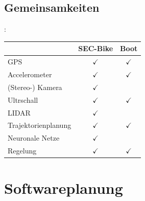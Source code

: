 \documentclass{beamer}
\begin{document}
\subsection{Gemeinsamkeiten}
\begin{frame}{\insertsection: \insertsubsection}
\begin{table}
	\begin{tabular}{|l|c|c|}
		\hline
		& SEC-Bike & Boot \\ \hline
		GPS & $\checkmark$ & $\checkmark$ \\ \hline
		Accelerometer & $\checkmark$ & $\checkmark$ \\ \hline
		(Stereo-) Kamera & $\checkmark$ & \\ \hline
		Ultrschall & $\checkmark$ & $\checkmark$ \\ \hline
		LIDAR & $\checkmark$ & \\ \hline
		Trajektorienplanung & $\checkmark$ & $\checkmark$ \\ \hline
		Neuronale Netze & $\checkmark$ & \\ \hline
		Regelung & $\checkmark$ & $\checkmark$ \\ \hline
	\end{tabular}
\end{table}
\end{frame}

\section{Softwareplanung}
\end{document}
